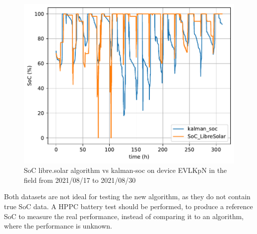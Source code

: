 \begin{figure}[h!]
\centering	
\includegraphics{EVLKpN_20210817-20210830-librevskalman.pdf}
\caption{\label{fig:librevskalman-EVLKpN} SoC libre.solar algorithm vs kalman-soc on device EVLKpN in the field from 2021/08/17 to 2021/08/30 }
\end{figure}


Both datasets are not ideal for testing the new algorithm, as they do not contain true SoC data. A HPPC battery test should be performed, to produce a reference SoC to measure the real performance, instead of comparing it to an algorithm, where the performance is unknown.

%
%
	

